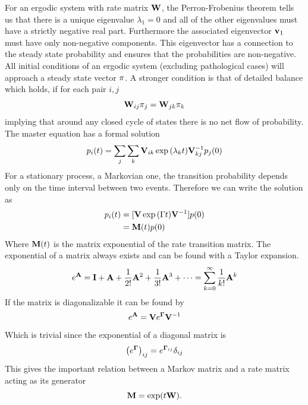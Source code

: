 For an ergodic system with rate matrix ${\bf W}$, the Perron-Frobenius theorem tells us that there is a unique eigenvalue $\lambda_1=0$ and all of the other eigenvalues must have a strictly negative real part. Furthermore the associated eigenvector ${\bf v}_1$ must have only non-negative components. This eigenvector has a connection to the steady state probability and ensures that the probabilities are non-negative. All initial conditions of an ergodic system (excluding pathological cases) will approach a steady state vector ${\bf \pi}$. A stronger condition is that of detailed balance which holds, if for each pair $i,j$
\begin{equation}
  {\bf W}_{ij} {\bf \pi} _{j} = {\bf W}_{jk} {\bf \pi} _{k}
\end{equation}
%
implying that around any closed cycle of states there is no net flow of probability. The master equation has a formal solution
\begin{equation}
  p_i(t) = \sum_{j} \sum_{k} {\bf V}_{ik} \exp { \left( \lambda_k t \right) } {\bf V}^{-1}_{kj} p_j(0)
\end{equation}
%
For a stationary process, \ie a Markovian one, the transition probability depends only on the time interval between two events. Therefore we can write the solution as
\begin{align}
  p_i(t)
  &= [{\bf V} \exp { \left(  {\Gamma t}  \right) } {\bf V}^{-1}] p(0) 
  \\ 
  &= {\bf M}(t) p(0)
\end{align}
%
Where ${\bf M}(t)$ is the matrix exponential of the rate transition matrix. The exponential of a matrix always exists and can be found with a Taylor expansion.
%
\begin{equation}
e ^ {{\bf A}} = {\bf I} + {\bf A} + \frac{1}{2!}{\bf A}^2 + \frac{1}{3!}{\bf A}^3 + \dots = \sum_{k=0}^{\infty}\frac{1}{k!}{\bf A}^k
\end{equation}
If the matrix is diagonalizable it can be found by
\begin{equation}
e^{{\bf A}} = {\bf V} e^{{\bf \Gamma}} {\bf V}^{-1}
\end{equation}
Which is trivial since the exponential of a diagonal matrix is
\begin{equation}
\left(  e^{{\bf \Gamma}}  \right) _{ij} = e^{{\bf \Gamma}_{ij}} \delta_{ij}
\end{equation}
%
This gives the important relation between a Markov matrix and a rate matrix acting as its generator
\begin{equation}
  {\bf M} = \exp(t {\bf W}) .
\end{equation}

